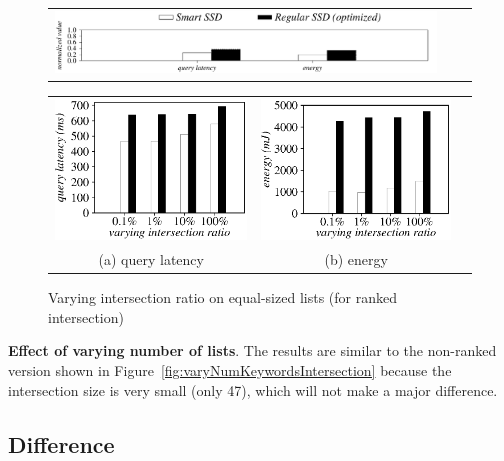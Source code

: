   \begin{figure}[htbp]
  \centering
    \begin{tabular}{ccc}
 \includegraphics[width=0.52\columnwidth]{figures/banner2.pdf}
\end{tabular}
\vspace{-0.1cm}
\renewcommand{\tabcolsep}{0.1mm}
  \begin{tabular}{ccc}
 \includegraphics[width=0.5\columnwidth]{figures/RankIntersection-time-VaryInterRatio-equal2.eps}&
  \includegraphics[width=0.5\columnwidth]{figures/RankIntersection-energy-VaryInterRatio-equal2.eps}\\
  (a) query latency & (b) energy\\
\end{tabular}
  \caption{Varying intersection ratio on equal-sized lists (for ranked intersection)}
  \label{fig:varyRankInterRatioIntersection2}
 \end{figure}


\textbf{Effect of varying number of lists}.
The results are similar to the non-ranked version shown in Figure~\ref{fig:varyNumKeywordsIntersection} because the intersection size is very small (only 47), which will not make a major difference.

\subsection{Difference}\label{sec:expDifference}

